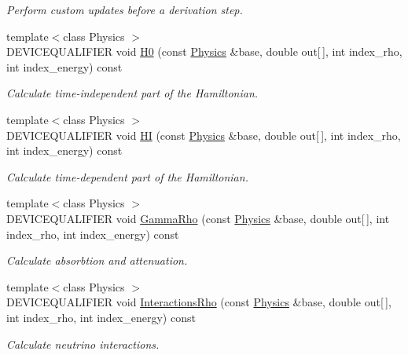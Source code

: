 \begin{DoxyCompactItemize}
\begin{DoxyCompactList}\small\item\em Perform custom updates before a derivation step. \end{DoxyCompactList}\item 
{\footnotesize template$<$class Physics $>$ }\\D\+E\+V\+I\+C\+E\+Q\+U\+A\+L\+I\+F\+I\+ER void \hyperlink{structcudanusquids_1_1PhysicsOps_af924f96f9ad6604eca1ed9d579bf1acb}{H0} (const \hyperlink{structcudanusquids_1_1Physics}{Physics} \&base, double out\mbox{[}$\,$\mbox{]}, int index\+\_\+rho, int index\+\_\+energy) const 
\begin{DoxyCompactList}\small\item\em Calculate time-\/independent part of the Hamiltonian. \end{DoxyCompactList}\item 
{\footnotesize template$<$class Physics $>$ }\\D\+E\+V\+I\+C\+E\+Q\+U\+A\+L\+I\+F\+I\+ER void \hyperlink{structcudanusquids_1_1PhysicsOps_a3cc24a1183d37f69c1a0ebf4e5e0dea4}{HI} (const \hyperlink{structcudanusquids_1_1Physics}{Physics} \&base, double out\mbox{[}$\,$\mbox{]}, int index\+\_\+rho, int index\+\_\+energy) const 
\begin{DoxyCompactList}\small\item\em Calculate time-\/dependent part of the Hamiltonian. \end{DoxyCompactList}\item 
{\footnotesize template$<$class Physics $>$ }\\D\+E\+V\+I\+C\+E\+Q\+U\+A\+L\+I\+F\+I\+ER void \hyperlink{structcudanusquids_1_1PhysicsOps_a15b807dff23fee0169712406e2e16a1d}{Gamma\+Rho} (const \hyperlink{structcudanusquids_1_1Physics}{Physics} \&base, double out\mbox{[}$\,$\mbox{]}, int index\+\_\+rho, int index\+\_\+energy) const 
\begin{DoxyCompactList}\small\item\em Calculate absorbtion and attenuation. \end{DoxyCompactList}\item 
{\footnotesize template$<$class Physics $>$ }\\D\+E\+V\+I\+C\+E\+Q\+U\+A\+L\+I\+F\+I\+ER void \hyperlink{structcudanusquids_1_1PhysicsOps_acd4454bff2fa6824145b5cd19d2d0ecf}{Interactions\+Rho} (const \hyperlink{structcudanusquids_1_1Physics}{Physics} \&base, double out\mbox{[}$\,$\mbox{]}, int index\+\_\+rho, int index\+\_\+energy) const 
\begin{DoxyCompactList}\small\item\em Calculate neutrino interactions. \end{DoxyCompactList}\end{DoxyCompactItemize}


